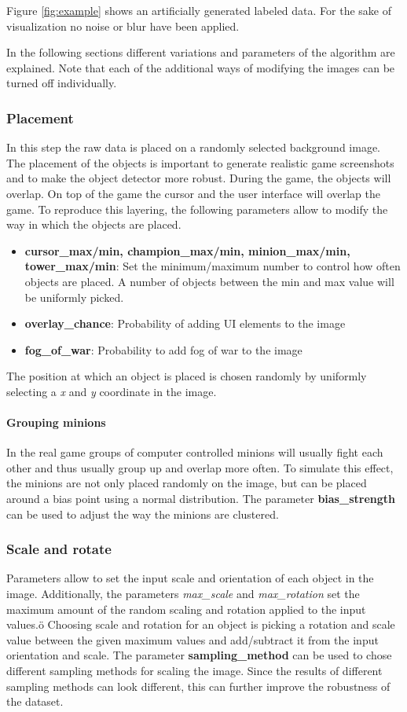 Figure \ref{fig:example} shows an artificially generated labeled data. For the sake of visualization no noise or blur have been applied. 

In the following sections different variations and parameters of the algorithm are explained.
Note that each of the additional ways of modifying the images can be turned off individually.

\subsubsection{Placement}
In this step the raw data is placed on a randomly selected background image.
The placement of the objects is important to generate realistic game screenshots and to make the object detector more robust.
During the game, the objects will overlap.
On top of the game the cursor and the user interface will overlap the game.
To reproduce this layering, the following parameters allow to modify the way in which the objects are placed.
\begin{itemize}
\item \textbf{cursor\_max/min, champion\_max/min, minion\_max/min, tower\_max/min}: Set the minimum/maximum number to control how often objects are placed. A number of objects between the min and max value will be uniformly picked.
\item \textbf{overlay\_chance}: Probability of adding UI elements to the image 
\item \textbf{fog\_of\_war}: Probability to add fog of war to the image
\end{itemize}

The position at which an object is placed is chosen randomly by uniformly selecting a \textit{x} and \textit{y} coordinate in the image.

\paragraph*{\textbf{Grouping minions}}
In the real game groups of computer controlled minions will usually fight each other and thus usually group up and overlap more often.
To simulate this effect, the minions are not only placed randomly on the image, but can be placed around a bias point using a normal distribution.
The parameter \textbf{bias\_strength} can be used to adjust the way the minions are clustered.

\subsubsection{Scale and rotate}
Parameters allow to set the input scale and orientation of each object in the image.
Additionally, the parameters \textit{max\_scale} and \textit{max\_rotation} set the maximum amount of the random scaling and rotation applied to the input values.ö
Choosing scale and rotation for an object is picking a rotation and scale value between the given maximum values and add/subtract it from the input orientation and scale.
The parameter \textbf{sampling\_method} can be used to chose different sampling methods for scaling the image.
Since the results of different sampling methods can look different, this can further improve the robustness of the dataset.

